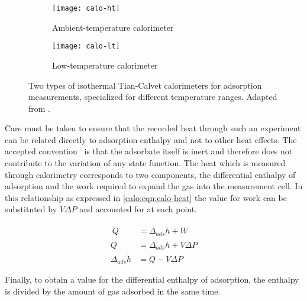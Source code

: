 \begin{figure}[htb]

  \centering
  \begin{subfigure}[b]{.45\textwidth}
      \centering
      \texttt{[image: calo-ht]}
      \caption{Ambient-temperature calorimeter}%
      \label{calo:fig:calo-ht}
  \end{subfigure}
  \begin{subfigure}[b]{.5\textwidth}
      \centering
      \texttt{[image: calo-lt]}
      \caption{Low-temperature calorimeter}%
      \label{calo:fig:calo-lt}
  \end{subfigure}%
  \caption{Two types of isothermal Tian-Calvet calorimeters
  for adsorption measurements, specialized for
  different temperature ranges.
  Adapted from \citeauthor{llewellynGasAdsorptionMicrocalorimetry2005}%
  \cite{llewellynGasAdsorptionMicrocalorimetry2005}.
  }%
  \label{calo:fig:calo-types}

\end{figure}

Care must be taken to ensure that
the recorded heat through such an experiment can be related directly 
to adsorption enthalpy and not to other heat effects.
The accepted convention~\cite{rouquerolGasSolidInteractions1980} is that 
the adsorbate itself is inert and 
therefore does not contribute to the variation of any state function.
The heat which is measured through calorimetry corresponds to 
two components, the differential enthalpy of adsorption and the 
work required to expand the gas into the measurement cell.
In this relationship as expressed in \autoref{calo:eqn:calo-heat}
the value for work can be substituted by \(V\Delta P\) and 
accounted for at each point.

\begin{align}\
  \dot{Q} & = \Delta_{ads} \dot{h} + W \label{calo:eqn:calo-heat} \\
  \dot{Q} & = \Delta_{ads} \dot{h} + V\Delta P \\
  \Delta_{ads} \dot{h} & = \dot{Q} - V\Delta P
\end{align}



Finally, to obtain a value for the differential enthalpy of adsorption,
the enthalpy is divided by the amount of gas adsorbed in the same 
time.

